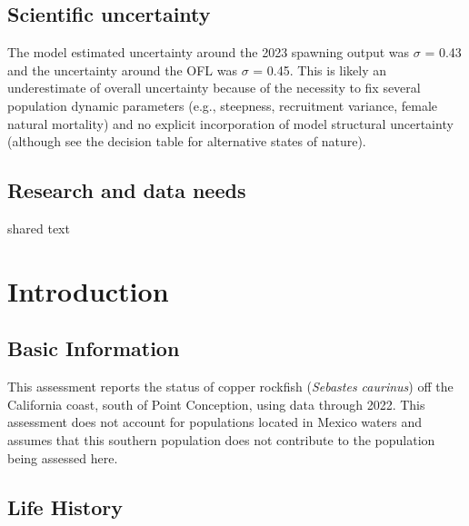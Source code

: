 \documentclass[11pt,
  english,
  letterpaper,
]{article}
\begin{document}
\hypertarget{scientific-uncertainty}{%
\subsection*{Scientific uncertainty}\label{scientific-uncertainty}}

The model estimated uncertainty around the 2023 spawning output was \(\sigma\) = 0.43 and the uncertainty around the OFL was \(\sigma\) = 0.45. This is likely an underestimate of overall uncertainty because of the necessity to fix several population dynamic parameters (e.g., steepness, recruitment variance, female natural mortality) and no explicit incorporation of model structural uncertainty (although see the decision table for alternative states of nature).

\hypertarget{research-and-data-needs}{%
\subsection*{Research and data needs}\label{research-and-data-needs}}

shared text

\pagebreak
\setlength{\parskip}{5mm plus1mm minus1mm}
\setcounter{page}{1}
\renewcommand{\thefigure}{\arabic{figure}}
\renewcommand{\thetable}{\arabic{table}}
\setcounter{table}{0}
\setcounter{figure}{0}

\hypertarget{introduction}{%
\section{Introduction}\label{introduction}}

\hypertarget{basic-information}{%
\subsection{Basic Information}\label{basic-information}}

This assessment reports the status of copper rockfish (\emph{Sebastes caurinus}) off the California coast, south of Point Conception, using data through 2022. This assessment does not account for populations located in Mexico waters and assumes that this southern population does not contribute to the population being assessed here.

\hypertarget{life-history}{%
\subsection{Life History}\label{life-history}}
\end{document}
